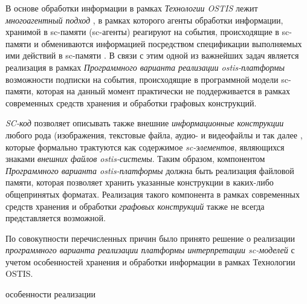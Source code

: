 \begin{SCn}
\begin{scnsubstruct}
\begin{scnsubstruct}
{\begin{scnitemize}
		\item В основе обработки информации в рамках \textit{Технологии OSTIS} лежит \textit{многоагентный подход} \cite{Shunkevich2022}, в рамках которого агенты обработки информации, хранимой в sc-памяти (sc-агенты) реагируют на события, происходящие в sc-памяти и обмениваются информацией посредством спецификации выполняемых ими действий в sc-памяти \cite{Shunkevich2018}. В связи с этим одной из важнейших задач является реализация в рамках \textit{Программного варианта реализации ostis-платформы} возможности подписки на события, происходящие в программной модели sc-памяти, которая на данный момент практически не поддерживается в рамках современных средств хранения и обработки графовых конструкций.
		\item \textit{SC-код} позволяет описывать также внешние \textit{информационные конструкции} любого рода (изображения, текстовые файла, аудио- и видеофайлы и так далее \cite{Ivashenko2022}, которые формально трактуются как содержимое \textit{sc-элементов}, являющихся знаками \textit{внешних файлов ostis-системы}. Таким образом, компонентом \textit{Программного варианта ostis-платформы} должна быть реализация файловой памяти, которая позволяет хранить указанные конструкции в каких-либо общепринятых форматах. Реализация такого компонента в рамках современных средств хранения и обработки \textit{графовых конструкций} также не всегда представляется возможной.
	\end{scnitemize}
	По совокупности перечисленных причин было принято решение о реализации \textit{программного варианта реализации платформы интерпретации sc-моделей}  с учетом особенностей хранения и обработки информации в рамках Технологии OSTIS.}
    \begin{scnrelfromset}{особенности реализации}

\end{scnrelfromset}
\end{scnsubstruct}
\end{scnsubstruct}
\end{SCn}

